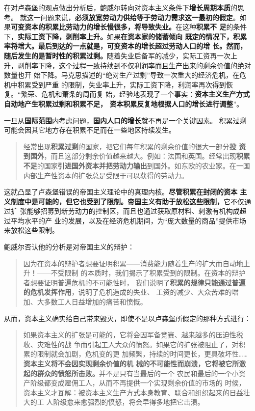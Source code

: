 在对卢森堡的观点做出分析后，鲍威尔转向对资本主义条件下\textbf{增长周期本质}的思考。
就这一问题来说，\textbf{必须放宽劳动力供给等于劳动力需求这一最初的假定}。如
果\textbf{可变资本的积累比劳动力的增长慢很多，将导致失业。}在这种\textbf{积累不
  足}的条件下，\textbf{实际工资下降，剥削率上升。}如果\textbf{在资本家的储蓄倾向
  既定的情况下，积累率将增大。最后到达的一点就是，可变资本的增长超过劳动人口的增
  长。然而，随后发生的是暂时性的积累过剩。}随着失业后备军的减少，实际工资再一次上
升，剥削率下降，这个过程一致持续到不仅利润率而且生产出来的剩余价值的绝对数量也开
始下降。马克思描述的“绝对生产过剩”导致一次重大的经济危机，在危机中积累受到严重
的限制，失业率上升，实际工资下降，利润率再次得到恢复。“繁荣、危机和萧条的周而复
始，经验地表现了一个事实：\textbf{资本主义生产方式自动地产生积累过剩和积累不足，
  资本积累反复地根据人口的增长进行调整}”。

一旦从\textbf{国际范围}内考虑问题，\textbf{国内人口的增长}就不再是一个关键因素。
积累过剩可能会因其它地方存在积累不足而在一些地区持续发生。
\begin{quotation}
  经常出现\textbf{积累过剩}的国家，把它们每年积累的剩余价值的很大一部分\textbf{投
    资到国外}，而且这部分剩余价值越来越大。例如：法国和英国。经常出现\textbf{积累
    不足}的国家\textbf{引进国外资本并把劳动力输出}到国外。如东欧的农业家。在一国
  内部生产性资本的扩张总是受限于可以获得的劳动力。
\end{quotation}

这就凸显了卢森堡错误的帝国主义理论中的真理内核。\textbf{尽管积累在封闭的资本
  主义制度中是可能的，但它也受到了限制。帝国主义有助于放松这些限制，}它不仅通过扩
张能够招募到新劳动力的控制区，而且也通过获取原材料、刺激有机构成超过平均水平的产
业的发展，以及在经济危机期间，为“庞大数量的商品”提供市场来放松这些限制。

鲍威尔否认他的分析是对帝国主义的辩护：
\begin{quotation}
  因为在资本的辩护者想要证明积累——消费能力随着生产的扩大而自动地上升！——不受限制
  的本质时，我们揭示了积累受到的限制。在资本的辩护者想要证明普遍危机的不可能性时，
  我们说明了\textbf{积累的规律只能通过普遍的危机发挥作用}，说明了危机造成的失业、
  工资的减少、大众苦难的增加、大多数工人日益增加的痛苦和愤慨。
\end{quotation}

从而，资本主义确实给自己带来毁灭，即使不是以卢森堡所假定的那种方式进行：
\begin{quotation}
  如果资本主义的扩张是可能的，它将会因军备竞赛、越来越多的压迫性税收、灾难性的战
  争而引起工人大众的愤怒。如果它的扩张被阻止了，对积累的限制就会加剧，危机变的更
  加频繁，持续的时间更长，更具破坏性……\textbf{资本主义将不会因实现剩余价值的机
    械的不可能性而崩溃，它将被它所激起的群众的愤怒所击败。}并不是只有当最后的一个
  农民和最后的一个小资产阶级都变成雇佣工人，从而不再提供一个实现剩余价值的市场的
  时候，资本主义才瓦解：被资本主义生产方式本身教育、联合和组织起来的日益壮大的工
  人阶级愈来愈强烈的愤怒，将会早得多地把它击溃。
\end{quotation}

